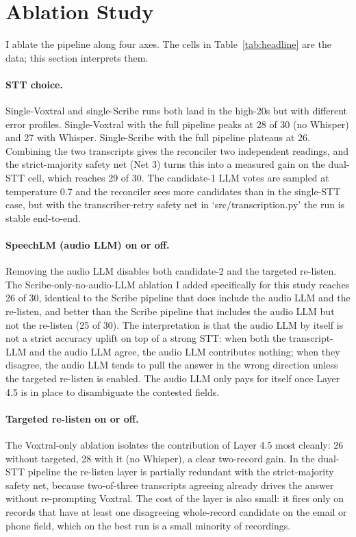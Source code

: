 \documentclass[11pt,a4paper]{article}
\begin{document}
\section{Ablation Study}

I ablate the pipeline along four axes. The cells in
Table~\ref{tab:headline} are the data; this section interprets them.

\paragraph{STT choice.}
Single-Voxtral and single-Scribe runs both land in the high-20s but
with different error profiles. Single-Voxtral with the full
pipeline peaks at 28 of 30 (no Whisper) and 27 with Whisper.
Single-Scribe with the full pipeline plateaus at 26. Combining the
two transcripts gives the reconciler two independent readings, and
the strict-majority safety net (Net 3) turns this into a measured
gain on the dual-STT cell, which reaches 29 of 30. The candidate-1
LLM votes are sampled at temperature 0.7 and the reconciler sees
more candidates than in the single-STT case, but with the
transcriber-retry safety net in `src/transcription.py' the run is
stable end-to-end.

\paragraph{SpeechLM (audio LLM) on or off.}
Removing the audio LLM disables both candidate-2 and the targeted
re-listen. The Scribe-only-no-audio-LLM ablation I added
specifically for this study reaches 26 of 30, identical to the
Scribe pipeline that does include the audio LLM and the re-listen,
and better than the Scribe pipeline that includes the audio LLM but
not the re-listen (25 of 30). The interpretation is that the audio
LLM by itself is not a strict accuracy uplift on top of a strong
STT: when both the transcript-LLM and the audio LLM agree, the
audio LLM contributes nothing; when they disagree, the audio LLM
tends to pull the answer in the wrong direction unless the targeted
re-listen is enabled. The audio LLM only pays for itself once Layer
4.5 is in place to disambiguate the contested fields.

\paragraph{Targeted re-listen on or off.}
The Voxtral-only ablation isolates the contribution of Layer 4.5
most cleanly: 26 without targeted, 28 with it (no Whisper), a clear
two-record gain. In the dual-STT pipeline the re-listen layer is
partially redundant with the strict-majority safety net, because
two-of-three transcripts agreeing already drives the answer without
re-prompting Voxtral. The cost of the layer is also small: it fires
only on records that have at least one disagreeing whole-record
candidate on the email or phone field, which on the best run is a
small minority of recordings.
\end{document}
